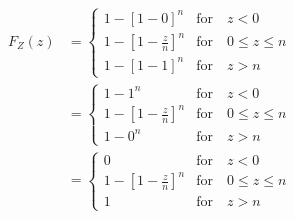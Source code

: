 \documentclass[12pt]{article}
\begin{document}
\begin{enumerate}
\begin{enumerate}
\begin{align*}
F_Z(z) &= \begin{cases}
1 - \left[ 1 - 0 \right]^{n} &\mbox{for} \quad z < 0\\
1 - \left[ 1 - \frac{z}{n} \right]^{n} &\mbox{for} \quad 0 \leq z \leq n \\
1 - \left[ 1 - 1 \right]^{n} &\mbox{for} \quad z > n
\end{cases} \\
&= \begin{cases}
1 - 1^{n} &\mbox{for} \quad z < 0\\
1 - \left[ 1 - \frac{z}{n} \right]^{n} &\mbox{for} \quad 0 \leq z \leq n \\
1 - 0^{n} &\mbox{for} \quad z > n
\end{cases} \\
&= \begin{cases}
0 &\mbox{for} \quad z < 0\\
1 - \left[ 1 - \frac{z}{n} \right]^{n} &\mbox{for} \quad 0 \leq z \leq n \\
1&\mbox{for} \quad z > n
\end{cases}
\end{align*}


\end{enumerate}
\end{enumerate}
\end{document}
